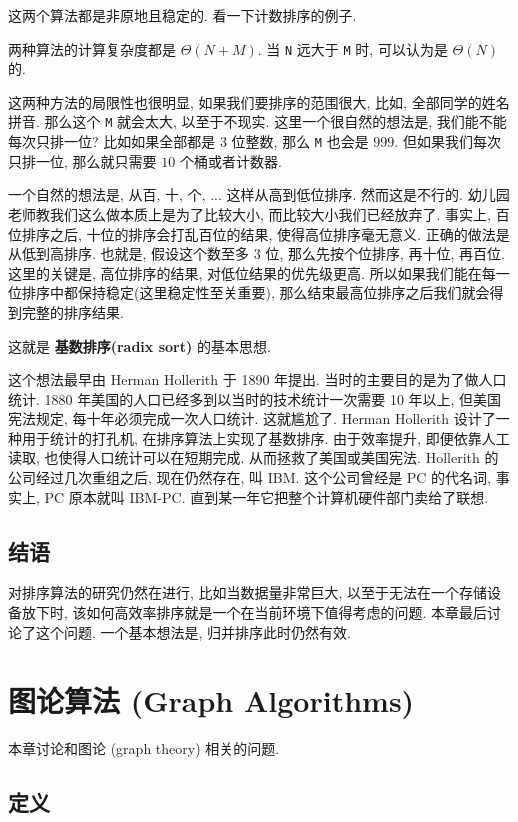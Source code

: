 \documentclass[a4paper]{ctexart}
\theoremstyle{definition}
\theoremstyle{definition}
\begin{document}
这两个算法都是非原地且稳定的. 看一下计数排序的例子. 

两种算法的计算复杂度都是 $\Theta(N + M)$. 当 \verb|N| 远大于 \verb|M| 时,
可以认为是 $\Theta(N)$ 的.

这两种方法的局限性也很明显, 如果我们要排序的范围很大, 比如,
全部同学的姓名拼音. 那么这个 \verb|M| 就会太大, 以至于不现实.
这里一个很自然的想法是, 我们能不能每次只排一位? 比如如果全部都是 $3$ 位整数,
那么 \verb|M| 也会是 $999$. 但如果我们每次只排一位,
那么就只需要 $10$ 个桶或者计数器. 

一个自然的想法是, 从百, 十, 个, ... 这样从高到低位排序. 然而这是不行的.
幼儿园老师教我们这么做本质上是为了比较大小, 而比较大小我们已经放弃了.
事实上, 百位排序之后, 十位的排序会打乱百位的结果, 使得高位排序毫无意义.
正确的做法是从低到高排序. 也就是, 假设这个数至多 3 位, 那么先按个位排序,
再十位, 再百位. 这里的关键是, 高位排序的结果, 对低位结果的优先级更高.
所以如果我们能在每一位排序中都保持稳定(这里稳定性至关重要),
那么结束最高位排序之后我们就会得到完整的排序结果.


这就是 {\bf 基数排序(radix sort)} 的基本思想.

这个想法最早由 Herman Hollerith 于 1890 年提出.
当时的主要目的是为了做人口统计.
1880 年美国的人口已经多到以当时的技术统计一次需要 10 年以上, 但美国宪法规定,
每十年必须完成一次人口统计. 这就尴尬了. Herman Hollerith 设计了一种用于统计的打孔机,
在排序算法上实现了基数排序. 由于效率提升, 即便依靠人工读取, 也使得人口统计可以在短期完成.
从而拯救了美国或美国宪法. Hollerith 的公司经过几次重组之后, 现在仍然存在,
叫 IBM. 这个公司曾经是 PC 的代名词, 事实上, PC 原本就叫 IBM-PC.
直到某一年它把整个计算机硬件部门卖给了联想. 

\subsection{结语}
对排序算法的研究仍然在进行, 比如当数据量非常巨大, 以至于无法在一个存储设备放下时,
该如何高效率排序就是一个在当前环境下值得考虑的问题. 本章最后讨论了这个问题.
一个基本想法是, 归并排序此时仍然有效.

\section{图论算法 (Graph Algorithms)}

本章讨论和图论 (graph theory) 相关的问题. 

\subsection{定义}
\end{document}
